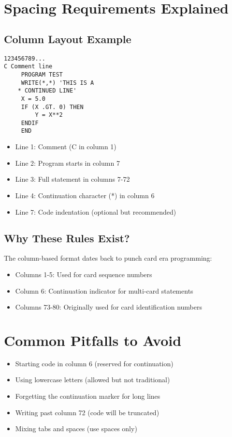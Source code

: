 \documentclass{book}
\begin{document}
\section*{Spacing Requirements Explained}

\subsection*{Column Layout Example}
\begin{verbatim}
123456789...
C Comment line
     PROGRAM TEST
     WRITE(*,*) 'THIS IS A
    * CONTINUED LINE'
     X = 5.0
     IF (X .GT. 0) THEN
         Y = X**2
     ENDIF
     END
\end{verbatim}

\begin{itemize}
    \item Line 1: Comment (C in column 1)
    \item Line 2: Program starts in column 7
    \item Line 3: Full statement in columns 7-72
    \item Line 4: Continuation character (*) in column 6
    \item Line 7: Code indentation (optional but recommended)
\end{itemize}

\subsection*{Why These Rules Exist?}
The column-based format dates back to punch card era programming:
\begin{itemize}
    \item Columns 1-5: Used for card sequence numbers
    \item Column 6: Continuation indicator for multi-card statements
    \item Columns 73-80: Originally used for card identification numbers
\end{itemize}

\section*{Common Pitfalls to Avoid}
\begin{itemize}
    \item Starting code in column 6 (reserved for continuation)
    \item Using lowercase letters (allowed but not traditional)
    \item Forgetting the continuation marker for long lines
    \item Writing past column 72 (code will be truncated)
    \item Mixing tabs and spaces (use spaces only)
\end{itemize}
\end{document}
